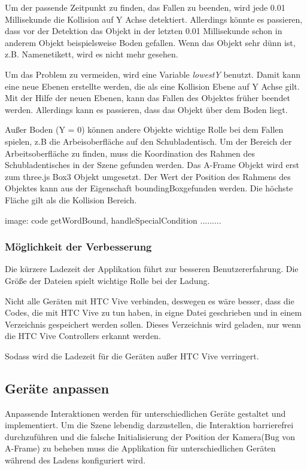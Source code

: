   Um der passende Zeitpunkt zu finden, das Fallen zu beenden, wird jede 0.01 Millisekunde die Kollision auf Y Achse detektiert. Allerdings könnte es passieren, dass vor der Detektion das Objekt in der letzten 0.01 Millisekunde schon in anderem Objekt beispielsweise Boden gefallen. Wenn das Objekt sehr dünn ist, z.B. Namenetikett, wird es nicht mehr gesehen.
  
  Um das Problem zu vermeiden, wird eine Variable \textit{lowestY} benutzt. Damit kann eine neue Ebenen erstellte werden, die als eine Kollision Ebene auf Y Achse gilt. Mit der Hilfe der neuen Ebenen, kann das Fallen des Objektes früher beendet werden. Allerdings kann es passieren, dass das Objekt über dem Boden liegt.
  
  Außer Boden (Y = 0) können andere Objekte wichtige Rolle bei dem Fallen spielen, z.B die Arbeisoberfläche auf den Schubladentisch. Um der Bereich der Arbeitsoberfläche zu finden, muss die Koordination des Rahmen des Schubladentisches in der Szene gefunden werden. Das A-Frame Objekt wird erst zum three.js Box3 Objekt umgesetzt. Der Wert der Position des Rahmens des Objektes kann aus der Eigenschaft \glqq boundingBox\grqq gefunden werden. Die höchste Fläche gilt als die Kollision Bereich.
  
  image: code getWordBound, handleSpecialCondition .........
  
  \subsubsection{Möglichkeit der Verbesserung}
  Die kürzere Ladezeit der Applikation führt zur besseren Benutzererfahrung. Die Größe der Dateien spielt wichtige Rolle bei der Ladung.
  
  Nicht alle Geräten mit HTC Vive verbinden, deswegen es wäre besser, dass die Codes, die mit HTC Vive zu tun haben, in eigne Datei geschrieben und in einem Verzeichnis gespeichert werden sollen. Dieses Verzeichnis wird geladen, nur wenn die HTC Vive Controllers erkannt werden.
  
  Sodass wird die Ladezeit für die Geräten außer HTC Vive verringert.
  
 \subsection{Geräte anpassen}
 Anpassende Interaktionen werden für unterschiedlichen Geräte gestaltet und implementiert. Um die Szene lebendig darzustellen, die Interaktion barrierefrei durchzuführen und die falsche Initialisierung der Position der Kamera(Bug von A-Frame) zu beheben muss die Applikation für unterschiedlichen Geräten während des Ladens konfiguriert wird.
 
